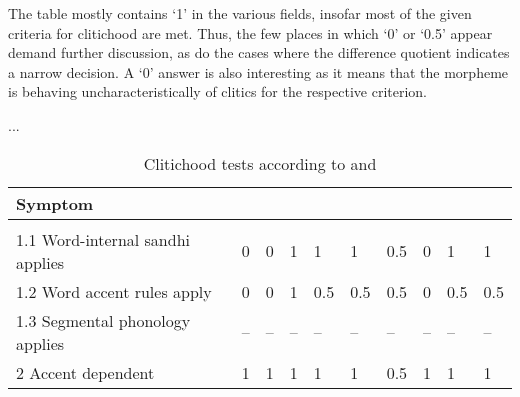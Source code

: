 The table mostly contains `1' in the various fields, insofar most of the given 
criteria for clitichood are met. Thus, the few places in which `0' or `0.5' 
appear demand further discussion, as do the cases where the difference 
quotient indicates a narrow decision. A `0' answer is also interesting as it 
means that the morpheme is behaving uncharacteristically of clitics for the 
respective criterion.

...

\begin{table}[p]
\caption{Clitichood tests according to \citet{klavans1985} and 
	\citet{zwicky1985}}
\smaller
\begin{tabu} to \linewidth {H[10l] X[c] X[c] X[c] X[c] X[c] X[c] X[c] X[c] X[c]}
\toprule\tableheaderfont

Symptom
	& 
	& 
	& 
	& 
	& 
	& 
	& 
	& 
	& 
	\\

\toprule
\tableheaderfont{} \\
\toprule

1.1 Word-internal sandhi applies
	& 0	%
	& 0	%
	& 1	%
	& 1	%
	& 1	%
	& 0.5	%
	& 0	%
	& 1	%
	& 1	%
	\\ \midrule

1.2 Word accent rules apply
	& 0	%
	& 0	%
	& 1	%
	& 0.5	%
	& 0.5	%
	& 0.5	%
	& 0	%
	& 0.5	%
	& 0.5	%
	\\ \midrule

1.3 Segmental phonology applies
	& --	%
	& --	%
	& --	%
	& --	%
	& --	%
	& --	%
	& --	%
	& --	%
	& --	%
	\\ \midrule

2 Accent dependent
	& 1	%
	& 1	%
	& 1	%
	& 1	%
	& 1	%
	& 0.5	%
	& 1	%
	& 1	%
	& 1	%
	\\ \midrule


\end{tabu}
\end{table}

